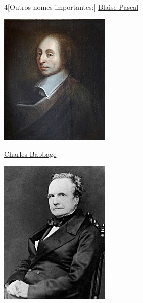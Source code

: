 \vfill\null
\pagebreak	


\begin{multicols}{4}[Outros nomes importantes:]
	\href{https://pt.wikipedia.org/wiki/Blaise_Pascal}{Blaise Pascal}
	
\begin{center}
		\includegraphics[width=.8\columnwidth]{./IMG-GIT/CIENTISTAS/Blaise_Pascal_Versailles.JPG}
\end{center}

\vfill\null
\columnbreak

\begin{center}
	\href{https://pt.wikipedia.org/wiki/Charles_Babbage}{Charles Babbage}


\includegraphics[width=.8\columnwidth]{./IMG-GIT/CIENTISTAS/Charles_Babbage_-_1860.jpg}
\end{center}


\end{multicols}

